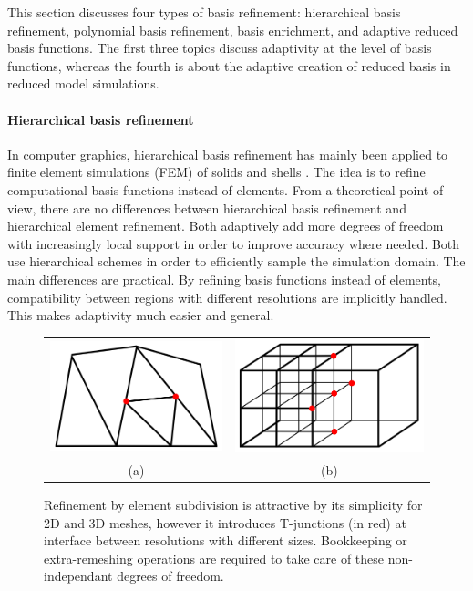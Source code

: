 This section discusses four types of basis refinement: hierarchical basis refinement, polynomial basis refinement, basis enrichment, and adaptive reduced basis functions.
The first three topics discuss adaptivity at the level of basis functions, whereas the fourth is about the adaptive creation of reduced basis in reduced model simulations.

\paragraph*{Hierarchical basis refinement}
In computer graphics, hierarchical basis refinement has mainly been applied to finite element simulations (FEM) of solids and shells \cite{Capell2002,Grinspun2002}. The idea is to refine computational basis functions instead of elements. From a theoretical point of view, there are no differences between hierarchical basis refinement and hierarchical element refinement. Both adaptively add more degrees of freedom with increasingly local support in order to improve accuracy where needed. Both use hierarchical schemes in order to efficiently sample the simulation domain.
The main differences are practical. By refining basis functions instead of elements, compatibility between regions with different resolutions are implicitly handled.
This makes adaptivity much easier and general.

\begin{figure}[t]
\centering
\begin{tabular}{cc}
    \includegraphics[width=0.45\linewidth]{images/starAdaptivity-cgf2016/tjunction-triangle.png} &
    \includegraphics[width=0.45\linewidth]{images/starAdaptivity-cgf2016/tjunction-grid.png} \\
(a) & (b)
\end{tabular}
\caption{\label{fig:tjunctions} Refinement by element subdivision is attractive by its simplicity for 2D and 3D meshes, however it introduces T-junctions (in red) at interface between resolutions with different sizes. Bookkeeping or extra-remeshing operations are required to take care of these non-independant degrees of freedom.}
\end{figure}

